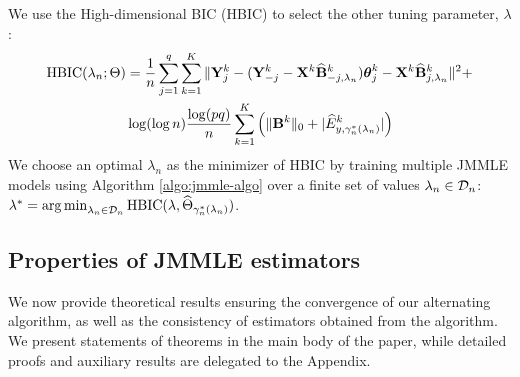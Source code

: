 We use the High-dimensional BIC (HBIC) to select the other tuning parameter, $\lambda$:
%
\begin{align*}
\text{HBIC} (\lambda_n; \Theta) &=
\frac{1}{n} \sum_{j=1}^q \sum_{k=1}^K \| {\mathbf{Y}}^k_j - ({\mathbf{Y}}_{-j}^k - {\mathbf{X}}^k \widehat {{\mathbf{B}}}_{-j,\lambda_n}^k ) {\boldsymbol{\theta}}_j^{k } - {\mathbf{X}}^k \widehat {{\mathbf{B}}}_{j,\lambda_n}^k \|^2 +\\
& \log (\log n) \frac{\log (pq)}{n} \sum_{k=1}^K
\left( \| {\mathbf{B}}^k \|_0 + | \widehat E_{y, \gamma_n^* (\lambda_n)}^k| \right)
\end{align*}
%
We choose an optimal $\lambda_n$ as the minimizer of HBIC by training multiple JMMLE models using Algorithm \ref{algo:jmmle-algo} over a finite set of values $\lambda_n \in {\cal{D}}_n$: 
$
\lambda^* = \operatorname*{arg\,min}_{\lambda_n \in {\cal{D}}_n} \text{HBIC} (\lambda, \widehat \Theta_{\gamma_n^*(\lambda_n)})
$.

%
%
%

%

\subsection{Properties of JMMLE estimators}
\label{sec:jmmle-theory}
We now provide theoretical results ensuring the convergence of our alternating algorithm, as well as the consistency of estimators obtained from the algorithm. We present statements of theorems in the main body of the paper, while detailed proofs and auxiliary results are delegated to the Appendix.

